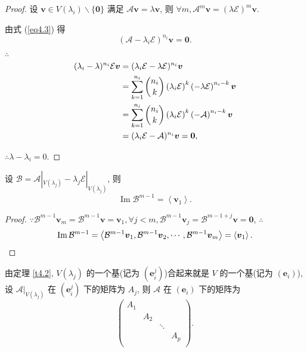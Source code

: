 \documentclass{ctexart}
\begin{document}
\begin{proof}
    设 $\boldsymbol{v}\in V(\lambda_i)\backslash\{\boldsymbol{0}\}$ 满足 $\mathcal{A}\boldsymbol{v}=\lambda\boldsymbol{v}$, 则 $\forall m,\mathcal{A}^m\boldsymbol{v}=(\lambda\mathcal{E})^m\boldsymbol{v}$.

    由式 (\ref{eq4.3}) 得
    \[(\mathcal{A}-\lambda_i\mathcal{E})^{n_i}\boldsymbol{v}=\boldsymbol{0}.\]

    $\therefore$
    \begin{align*}
        (\lambda_i-\lambda)^{n_i}\mathcal{E}\boldsymbol{v} & =(\lambda_i\mathcal{E}-\lambda\mathcal{E})^{n_i}\boldsymbol{v} \\
        & =\sum\limits_{k=1}^{n_i}\dbinom{n_i}{k}\left(\lambda_i\mathcal{E}\right)^k\left(-\lambda\mathcal{E}\right)^{n_i-k}\boldsymbol{v} \\
        & =\sum\limits_{k=1}^{n_i}\dbinom{n_i}{k}\left(\lambda_i\mathcal{E}\right)^k\left(-\mathcal{A}\right)^{n_i-k}\boldsymbol{v} \\
        & =(\lambda_i\mathcal{E}-\mathcal{A})^{n_i}\boldsymbol{v}=\boldsymbol{0},
    \end{align*}

    $\therefore\lambda-\lambda_i=0$.
\end{proof}
\begin{corollary}
    设 $\mathcal{B}=\mathcal{A}|_{V(\lambda_j)}-\lambda_j\mathcal{E}|_{V(\lambda_j)}$, 则
    \[\operatorname{Im}\mathcal{B}^{m-1}=\left<\boldsymbol{v}_1\right>.\]
\end{corollary}
\begin{proof}
    $\because\mathcal{B}^{m-1}\boldsymbol{v}_m=\mathcal{B}^{m-1}\boldsymbol{v}=\boldsymbol{v}_1,\forall j<m,\mathcal{B}^{m-1}\boldsymbol{v}_j=\mathcal{B}^{m-1+j}\boldsymbol{v}=\boldsymbol{0}$, $\therefore$
    \[\operatorname{Im}\mathcal{B}^{m-1}=\left<\mathcal{B}^{m-1}\boldsymbol{v}_1,\mathcal{B}^{m-1}\boldsymbol{v}_2,\cdots,\mathcal{B}^{m-1}\boldsymbol{v}_m\right>=\left<\boldsymbol{v}_1\right>.\qedhere\]
\end{proof}
由定理 \ref{t4.2}, $V(\lambda_j)$ 的一个基(记为 $(\boldsymbol{e}^j_i)$)合起来就是 $V$ 的一个基(记为 $(\boldsymbol{e}_i)$), 设 $\mathcal{A}|_{V(\lambda_j)}$ 在 $(\boldsymbol{e}^j_i)$ 下的矩阵为 $A_j$, 则 $\mathcal{A}$ 在 $(\boldsymbol{e}_i)$ 下的矩阵为
\[\begin{pmatrix}
    A_1 \\
    & A_2 \\
    && \ddots \\
    &&& A_p \\
\end{pmatrix}.\]
\end{document}
